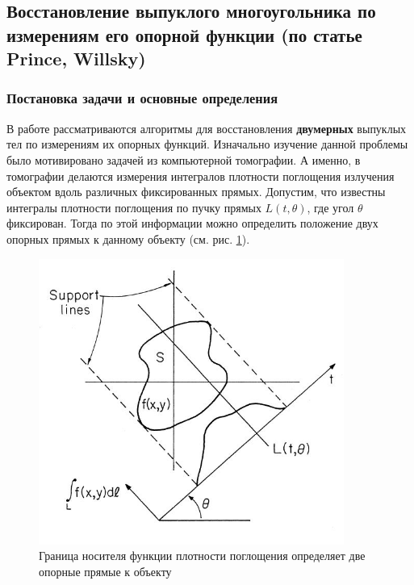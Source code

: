 \documentclass[a4paper, 12pt, titlepage]{article}
\theoremstyle{definition}
\theoremstyle{plain}
\begin{document}

\newpage
\subsection{Восстановление выпуклого многоугольника по измерениям его опорной
функции (по статье Prince, Willsky)}
\label{sec:history/PrinceW90}

\subsubsection{Постановка задачи и основные определения}
\label{sec:history/PrinceW90/problem}

В работе \cite[Prince - Willsky (1990)]{journals/pami/PrinceW90}
рассматриваются алгоритмы для восстановления \textbf{двумерных} выпуклых тел по
измерениям их опорных функций. Изначально изучение данной проблемы было
мотивировано задачей из компьютерной томографии. А именно, в томографии
делаются измерения интегралов плотности поглощения излучения объектом вдоль
различных фиксированных прямых. Допустим, что известны интегралы плотности
поглощения по пучку прямых $L(t, \theta)$, где угол $\theta$ фиксирован. Тогда
по этой информации можно определить положение двух опорных прямых к данному
объекту (см. рис. \ref{tomography-application}).

\begin{figure}[ht]
    \includegraphics[width=10cm]{images/tomography-application.jpg}
    \caption{Граница носителя функции плотности поглощения определяет две
    опорные прямые к объекту}
    \label{tomography-application}
\end{figure}
\end{document}
